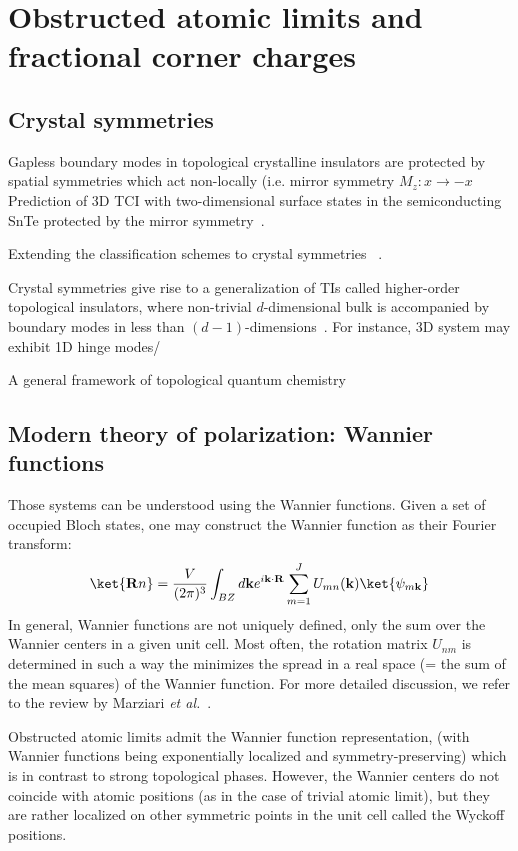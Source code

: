 \chapter{Obstructed atomic limits and fractional corner charges}
\label{ch:oals}


\section{Crystal symmetries}
Gapless boundary modes in topological crystalline insulators are protected by spatial symmetries which act non-locally (i.e. mirror symmetry $M_z: x \rightarrow -x$
Prediction of 3D TCI with two-dimensional surface states in the semiconducting SnTe protected by the mirror symmetry~\cite{FuTCI2011, HsiehTCI2012}.

Extending the classification schemes to crystal symmetries ~\cite{Slager2013, PhysRevB.90.165114, PhysRevB.93.195413, PhysRevB.95.235425, PhysRevB.93.045429}.

Crystal symmetries give rise to a generalization of TIs called higher-order topological insulators, where non-trivial $d$-dimensional bulk is accompanied by boundary modes in less than $(d-1)$-dimensions~\cite{Benalcazar61, PhysRevLett.119.246401, HOTI12018}. For instance, 3D system may exhibit 1D hinge modes/


A general framework of topological quantum chemistry~\cite{TQC2017}

\section{Modern theory of polarization: Wannier functions}
Those systems can be understood using the Wannier functions. Given a set of occupied Bloch states, one may construct the Wannier function as their Fourier transform:
\begin{equation}
\ket{\mathbf{R} n} = \frac{V}{(2 \pi)^3} \int_{BZ} d \mathbf{k} e^{i \mathbf{k} \cdot \mathbf{R}} \sum_{m = 1}^J U_{mn} (\mathbf{k}) \ket{\psi_{m\mathbf{k}}} 
\end{equation}
In general, Wannier functions are not uniquely defined, only the sum over the Wannier centers in a given unit cell. Most often, the rotation matrix $U_{nm}$ is determined in such a way the minimizes the spread in a real space (= the sum of the mean squares) of the Wannier function. For more detailed discussion, we refer to the review by Marziari \emph{et al.}~\cite{MarziariWF2012}. 

Obstructed atomic limits admit the Wannier function representation, (with Wannier functions being exponentially localized and symmetry-preserving) which is in contrast to strong topological phases. However, the Wannier centers do not coincide with atomic positions (as in the case of trivial atomic limit), but they are rather localized on other symmetric points in the unit cell called the Wyckoff positions.


